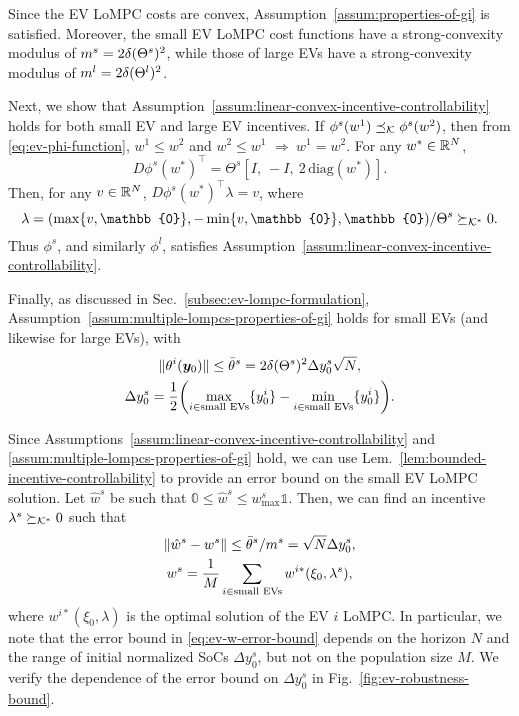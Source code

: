 Since the EV LoMPC costs are convex, Assumption~\ref{assum:properties-of-gi} is satisfied.
Moreover, the small EV LoMPC cost functions have a strong-convexity modulus of $m^s = 2 \delta (\Theta^s)^2$, while those of large EVs have a strong-convexity modulus of $m^l = 2 \delta (\Theta^l)^2$.

Next, we show that Assumption~\ref{assum:linear-convex-incentive-controllability} holds for both small EV and large EV incentives.
If $\phi^s(w^1) \preceq_{\mathcal{K}} \phi^s(w^2)$, then from \eqref{eq:ev-phi-function}, $w^1 \leq w^2$ and $w^2 \leq w^1$ $\Rightarrow \ w^1 = w^2$.
For any $w^* \in \mathbb{R}^N$,
\begin{equation*}
    D\phi^s(w^*)^\top = \Theta^s [I, \ -I, \ 2 \, \text{diag}(w^*)].
\end{equation*}
Then, for any $v \in \mathbb{R}^N$, $D\phi^s(w^*)^\top\lambda = v$, where
\begin{equation*}
\lambda = (\max\{v, \mathbb{0}\}, -\min\{v, \mathbb{0}\}, \mathbb{0}) / \Theta^s \succeq_{\mathset{K}^*} 0.
\end{equation*}
Thus $\phi^s$, and similarly $\phi^l$, satisfies Assumption~\ref{assum:linear-convex-incentive-controllability}.

Finally, as discussed in Sec.~\ref{subsec:ev-lompc-formulation}, Assumption~\ref{assum:multiple-lompcs-properties-of-gi} holds for small EVs (and likewise for large EVs), with
\begin{equation}
\label{eq:ev-theta-bar}
\begin{gathered}
    \lVert \theta^i(\bm{y}_0)\rVert \leq \bar{\theta}^s = 2 \delta (\Theta^s)^2 \Delta y_0^s \sqrt{N}, \\
    \Delta y_0^s = \frac{1}{2} \biggl(\max_{i \in \text{small EVs}} \{y^i_0\} - \min_{i \in \text{small EVs}} \{y^i_0\}\biggr).
\end{gathered}
\end{equation}

Since Assumptions~\ref{assum:linear-convex-incentive-controllability} and \ref{assum:multiple-lompcs-properties-of-gi} hold, we can use Lem.~\ref{lem:bounded-incentive-controllability} to provide an error bound on the small EV LoMPC solution.
Let $\hat{w}^s$ be such that $\mathbb{0} \leq \hat{w}^s \leq w^s_\text{max} \mathbb{1}$.
Then, we can find an incentive $\lambda^s \succeq_{\mathcal{K}^*} 0$ such that
\begin{equation}
\label{eq:ev-w-error-bound}
\begin{gathered}
    \lVert \hat{w}^s - w^s \rVert \leq \bar{\theta}^s/m^s = \sqrt{N} \Delta y_0^s, \\
    w^s = \frac{1}{M} \sum_{i \in \text{small EVs}} w^{i*}(\xi_0, \lambda^s),
\end{gathered}
\end{equation}
where $w^{i*}(\xi_0, \lambda)$ is the optimal solution of the EV $i$ LoMPC.
In particular, we note that the error bound in \eqref{eq:ev-w-error-bound} depends on the horizon $N$ and the range of initial normalized SoCs $\Delta y^s_0$, but not on the population size $M$.
We verify the dependence of the error bound on $\Delta y^s_0$ in Fig.~\ref{fig:ev-robustness-bound}.


